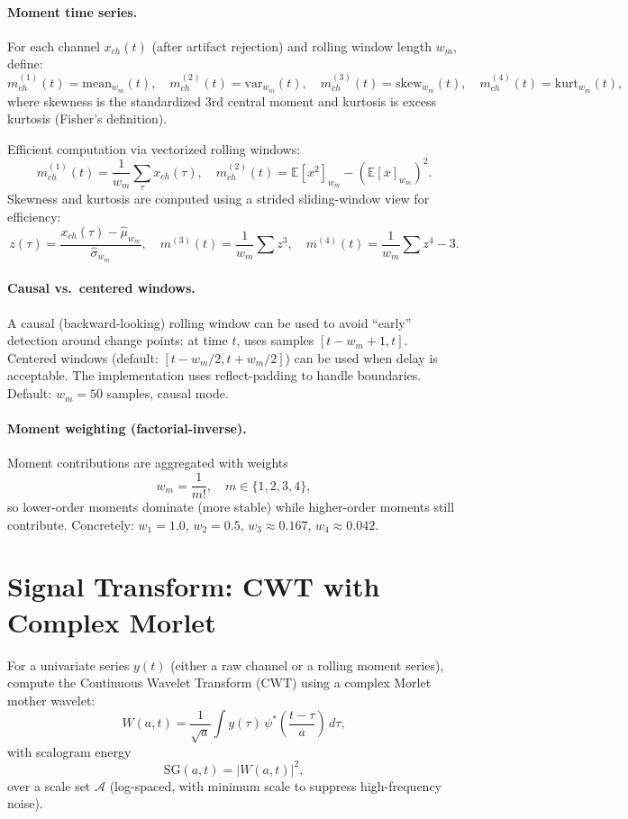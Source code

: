 \documentclass{article}
\begin{document}
\paragraph{Moment time series.}
For each channel $x_{ch}(t)$ (after artifact rejection) and rolling window length $w_m$, define:
\[
m_{ch}^{(1)}(t)=\mathrm{mean}_{w_m}(t),\quad
m_{ch}^{(2)}(t)=\mathrm{var}_{w_m}(t),\quad
m_{ch}^{(3)}(t)=\mathrm{skew}_{w_m}(t),\quad
m_{ch}^{(4)}(t)=\mathrm{kurt}_{w_m}(t),
\]
where skewness is the standardized 3rd central moment and kurtosis is excess kurtosis (Fisher's definition).

Efficient computation via vectorized rolling windows:
\[
m_{ch}^{(1)}(t) = \frac{1}{w_m}\sum_{\tau} x_{ch}(\tau),\quad
m_{ch}^{(2)}(t) = \mathbb{E}[x^2]_{w_m} - \left(\mathbb{E}[x]_{w_m}\right)^2.
\]
Skewness and kurtosis are computed using a strided sliding-window view for efficiency:
\[
z(\tau) = \frac{x_{ch}(\tau) - \hat{\mu}_{w_m}}{\hat{\sigma}_{w_m}},\quad
m^{(3)}(t) = \frac{1}{w_m}\sum z^3,\quad
m^{(4)}(t) = \frac{1}{w_m}\sum z^4 - 3.
\]

\paragraph{Causal vs.\ centered windows.}
A causal (backward-looking) rolling window can be used to avoid ``early'' detection around change points:
at time $t$, uses samples $[t - w_m + 1, t]$.
Centered windows (default: $[t - w_m/2, t + w_m/2]$) can be used when delay is acceptable.
The implementation uses reflect-padding to handle boundaries.
Default: $w_m = 50$ samples, causal mode.

\paragraph{Moment weighting (factorial-inverse).}
Moment contributions are aggregated with weights
\[
w_m = \frac{1}{m!},\quad m \in \{1, 2, 3, 4\},
\]
so lower-order moments dominate (more stable) while higher-order moments still contribute.
Concretely: $w_1 = 1.0$, $w_2 = 0.5$, $w_3 \approx 0.167$, $w_4 \approx 0.042$.

\section{Signal Transform: CWT with Complex Morlet}
For a univariate series $y(t)$ (either a raw channel or a rolling moment series), compute the
Continuous Wavelet Transform (CWT) using a complex Morlet mother wavelet:
\[
W(a,t)=\frac{1}{\sqrt{a}}\int y(\tau)\,\psi^*\!\left(\frac{t-\tau}{a}\right)\,d\tau,
\]
with scalogram energy
\[
\mathrm{SG}(a,t)=|W(a,t)|^2,
\]
over a scale set $\mathcal{A}$ (log-spaced, with minimum scale to suppress high-frequency noise).
\end{document}
